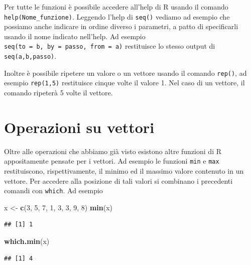 \documentclass[]{book}
\newenvironment{Shaded}{\begin{snugshade}}{\end{snugshade}}
\newcommand{\DecValTok}[1]{\textcolor[rgb]{0.00,0.00,0.81}{#1}}
\newcommand{\KeywordTok}[1]{\textcolor[rgb]{0.13,0.29,0.53}{\textbf{#1}}}
\newcommand{\NormalTok}[1]{#1}
\newcommand{\StringTok}[1]{\textcolor[rgb]{0.31,0.60,0.02}{#1}}
\begin{document}
Per tutte le funzioni è possibile accedere all'help di R usando il comando \texttt{help(Nome\_funzione)}. Leggendo l'help di \texttt{seq()} vediamo ad esempio che possiamo anche indicare in ordine diverso i parametri, a patto di specificarli usando il nome indicato nell'help. Ad esempio \texttt{seq(to\ =\ b,\ by\ =\ passo,\ from\ =\ a)} restituisce lo stesso output di \texttt{seq(a,b,passo)}.

Inoltre è possibile ripetere un valore o un vettore usando il comando \texttt{rep()}, ad esempio \texttt{rep(1,5)} restituisce cinque volte il valore 1. Nel caso di un vettore, il comando ripeterà 5 volte il vettore.

\hypertarget{operazioni-su-vettori}{%
\section{Operazioni su vettori}\label{operazioni-su-vettori}}

Oltre alle operazioni che abbiamo già visto esistono altre funzioni di R appositamente pensate per i vettori. Ad esempio le funzioni \texttt{min} e \texttt{max} restituiscono, rispettivamente, il minimo ed il massimo valore contenuto in un vettore. Per accedere alla posizione di tali valori si combinano i precedenti comandi con \texttt{which}. Ad esempio

\begin{Shaded}
\begin{Highlighting}[]
\NormalTok{x <-}\StringTok{ }\KeywordTok{c}\NormalTok{(}\DecValTok{3}\NormalTok{, }\DecValTok{5}\NormalTok{, }\DecValTok{7}\NormalTok{, }\DecValTok{1}\NormalTok{, }\DecValTok{3}\NormalTok{, }\DecValTok{3}\NormalTok{, }\DecValTok{9}\NormalTok{, }\DecValTok{8}\NormalTok{)}
\KeywordTok{min}\NormalTok{(x)}
\end{Highlighting}
\end{Shaded}

\begin{verbatim}
## [1] 1
\end{verbatim}

\begin{Shaded}
\begin{Highlighting}[]
\KeywordTok{which.min}\NormalTok{(x)}
\end{Highlighting}
\end{Shaded}

\begin{verbatim}
## [1] 4
\end{verbatim}
\end{document}
